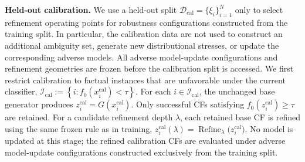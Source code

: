 

\textbf{Held-out calibration.}
We use a held-out split
$\mathcal{D}_{\mathrm{cal}}=\{\xi_i\}_{i=1}^{N}$
only to select refinement operating points for robustness configurations
constructed from the training split. In particular, the calibration data are
not used to construct an additional ambiguity set, generate new
distributional stresses, or update the corresponding adverse models.
All adverse model-update configurations and refinement geometries are frozen
before the calibration split is accessed. We first restrict calibration to factual instances that are unfavorable under
the current classifier,
$
\mathcal{I}_{\mathrm{cal}}
:=
\left\{
i:
f_0(x_i^{\mathrm{cal}})<\tau
\right\}.
$
For each $i\in\mathcal{I}_{\mathrm{cal}}$, the unchanged base generator
produces
$
z_i^{\mathrm{cal}}
=
G(x_i^{\mathrm{cal}}).
$
Only successful CFs satisfying
$f_0(z_i^{\mathrm{cal}})\geq\tau$
are retained. For a candidate refinement depth $\lambda$, each retained
base CF is refined using the same frozen rule as in training,
$
z_i^{\mathrm{cal}}(\lambda)
=
\operatorname{Refine}_{\lambda}
\bigl(z_i^{\mathrm{cal}}\bigr).
$
No model is updated at this stage; the refined calibration CFs are evaluated
under adverse model-update configurations constructed exclusively from the
training split.

